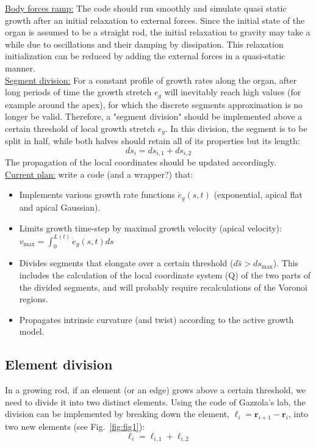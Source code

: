 \documentclass[a4paper, 11pt]{article}
\begin{document}
\noindent \underline{Body forces ramp:} The code should run smoothly and simulate quasi static growth after an initial relaxation to external forces. Since the initial state of the organ is assumed to be a straight rod, the initial relaxation to gravity may take a while due to oscillations and their damping by dissipation. This relaxation initialization can be reduced by adding the external forces in a quasi-static manner.\\

\noindent \underline{Segment division:} For a constant profile of growth rates along the organ, after long periods of time the growth stretch $e_g$ will inevitably reach high values (for example around the apex), for which the discrete segments approximation is no longer be valid. Therefore, a "segment division" should be implemented above a certain threshold of local growth stretch $e_g$. In this division, the segment is to be split in half, while both halves should retain all of its properties but its length:
\begin{equation}
    ds_i=ds_{i,1}+ds_{i,2}
\end{equation}
The propagation of the local coordinates should be updated accordingly.
\\

\noindent \underline{Current plan:} write a code (and a wrapper?) that: 
\begin{itemize}
    \item Implements various growth rate functions $\dot{e}_g(s,t)$ (exponential, apical flat and apical Gaussian). 
    \item Limits growth time-step by maximal growth velocity (apical velocity): $v_{\text{max}}=\int_0^{L(t)}\dot{e}_g(s,t)ds$ 
    \item Divides segments that elongate over a certain threshold ($d\hat{s}>ds_{\text{max}}$). This includes the calculation of the local coordinate system (Q) of the two parts of the divided segments, and will probably require recalculations of the Voronoi regions.
    \item Propagates intrinsic curvature (and twist) according to the active growth model.
\end{itemize}



\newpage

\subsection*{Element division}
In a growing rod, if an element (or an edge) grows above a certain threshold, we need to divide it into two distinct elements. Using the code of Gazzola's lab, the division can be implemented by breaking down the element, $\boldsymbol{\ell}_i=\boldsymbol{r}_{i+1}-\boldsymbol{r}_{i}$, into two new elements (see Fig.~\ref{fig:fig1}):
\begin{equation}
    \boldsymbol{\ell}_i=\boldsymbol{\ell}_{i,1}+\boldsymbol{\ell}_{i,2}
\end{equation}
\end{document}
